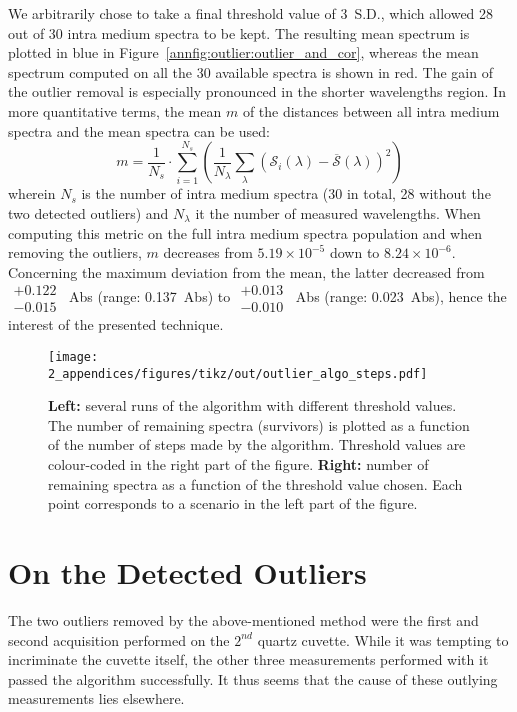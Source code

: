 We arbitrarily chose to take a final threshold value of 3~S.D., which allowed 28 out of 30 intra medium spectra to be kept. The resulting mean spectrum is plotted in blue in Figure~\ref{annfig:outlier:outlier_and_cor}, whereas the mean spectrum computed on all the 30 available spectra is shown in red. The gain of the outlier removal is especially pronounced in the shorter wavelengths region. In more quantitative terms, the mean $m$ of the distances between all intra medium spectra and the mean spectra can be used:
\begin{equation}
	m = \frac{1}{N_s}\cdot \sum_{i=1}^{N_s} \left( \frac{1}{N_{\lambda}} \sum_{\lambda}^{} \left( \mathcal{S}_i(\lambda) - \overline{\mathcal{S}}(\lambda) \right) ^2 \right)
\end{equation}
wherein $N_s$ is the number of intra medium spectra (30 in total, 28 without the two detected outliers) and $N_{\lambda}$ it the number of measured wavelengths. When computing this metric on the full intra medium spectra population and when removing the outliers, $m$ decreases from $5.19\times 10^{-5}$ down to $8.24\times 10^{-6}$. Concerning the maximum deviation from the mean, the latter decreased from $\substack{+0.122 \\ -0.015}$~Abs (range: 0.137~Abs) to $\substack{+0.013 \\ -0.010}$~Abs (range: 0.023~Abs), hence the interest of the presented technique.

\begin{figure}
	\centering
	\texttt{[image: 2\_appendices/figures/tikz/out/outlier\_algo\_steps.pdf]}
	\caption[Epoch-based view of the outlier removing algorithm.]{\textbf{Left:} several runs of the algorithm with different threshold values. The number of remaining spectra (survivors) is plotted as a function of the number of steps made by the algorithm. Threshold values are colour-coded in the right part of the figure. \textbf{Right:} number of remaining spectra as a function of the threshold value chosen. Each point corresponds to a scenario in the left part of the figure.}
	\label{annfig:outlier:outlier_algo_steps}
\end{figure}

\section{On the Detected Outliers}\label{annsect:outliers:outliers_discuss}

The two outliers removed by the above-mentioned method were the first and second acquisition performed on the $2^{nd}$ quartz cuvette. While it was tempting to incriminate the cuvette itself, the other three measurements performed with it passed the algorithm successfully. It thus seems that the cause of these outlying measurements lies elsewhere.

